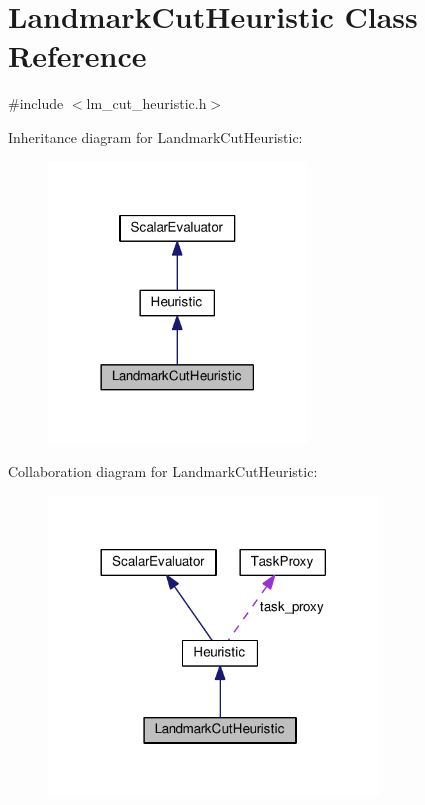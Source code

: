 \hypertarget{classLandmarkCutHeuristic}{\section{Landmark\-Cut\-Heuristic Class Reference}
\label{classLandmarkCutHeuristic}
}


{\ttfamily \#include $<$lm\-\_\-cut\-\_\-heuristic.\-h$>$}



Inheritance diagram for Landmark\-Cut\-Heuristic\-:
\nopagebreak
\begin{figure}[H]
\begin{center}
\leavevmode
\includegraphics[width=194pt]{classLandmarkCutHeuristic__inherit__graph}
\end{center}
\end{figure}


Collaboration diagram for Landmark\-Cut\-Heuristic\-:
\nopagebreak
\begin{figure}[H]
\begin{center}
\leavevmode
\includegraphics[width=248pt]{classLandmarkCutHeuristic__coll__graph}
\end{center}
\end{figure}
